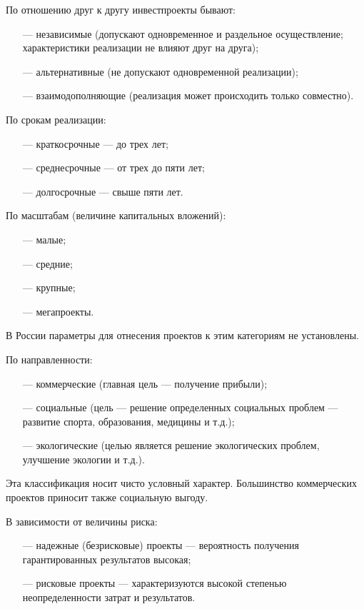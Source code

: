 По отношению друг к другу инвестпроекты бывают:
\begin{enumerate}
	\setlength\itemsep{0pt}
	\item [---] независимые (допускают одновременное и раздельное осуществление; характеристики реализации не влияют друг на друга);
	\item [---] альтернативные (не допускают одновременной реализации);
	\item [---] взаимодополняющие (реализация может происходить только совместно).
\end{enumerate}

По срокам реализации:
\begin{enumerate}
	\setlength\itemsep{0pt}
	\item [---] краткосрочные --- до трех лет;
	\item [---] среднесрочные --- от трех до пяти лет;
	\item [---] долгосрочные --- свыше пяти лет.
\end{enumerate}

По масштабам (величине капитальных вложений):
\begin{enumerate}
	\setlength\itemsep{0pt}
	\item [---] малые;
	\item [---] средние;
	\item [---] крупные;
	\item [---] мегапроекты.
\end{enumerate}

В России параметры для отнесения проектов к этим категориям не установлены.

По направленности:
\begin{enumerate}
	\setlength\itemsep{0pt}
	\item [---] коммерческие (главная цель --- получение прибыли);
	\item [---] социальные (цель --- решение определенных социальных проблем --- развитие спорта, образования, медицины и т.д.);
	\item [---] экологические (целью является решение экологических проблем, улучшение экологии и т.д.).
\end{enumerate}

Эта классификация носит чисто условный характер. Большинство коммерческих проектов приносит также социальную выгоду.


В зависимости от величины риска:
\begin{enumerate}
	\setlength\itemsep{0pt}
	\item [---] надежные (безрисковые) проекты --- вероятность получения гарантированных результатов высокая;
	\item [---] рисковые проекты --- характеризуются высокой степенью неопределенности затрат и результатов.
\end{enumerate}

